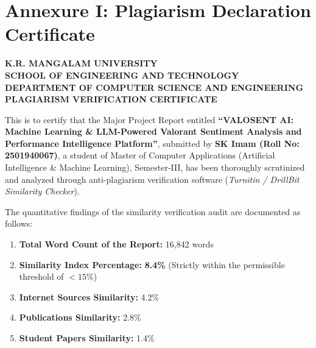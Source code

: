 \chapter*{Annexure I: Plagiarism Declaration Certificate}
\label{annex:plagiarism}

\thispagestyle{plain}

\begin{center}
    {\Large \bfseries \color{krmunavy} K.R. MANGALAM UNIVERSITY}\\[0.2cm]
    {\large \textbf{SCHOOL OF ENGINEERING AND TECHNOLOGY}}\\[0.15cm]
    {\normalsize \textbf{DEPARTMENT OF COMPUTER SCIENCE AND ENGINEERING}}\\[0.6cm]
    {\Large \bfseries \color{krmured} PLAGIARISM VERIFICATION CERTIFICATE}\\[0.8cm]
\end{center}

\noindent This is to certify that the Major Project Report entitled \textbf{``VALOSENT AI: Machine Learning \& LLM-Powered Valorant Sentiment Analysis and Performance Intelligence Platform''}, submitted by \textbf{SK Imam (Roll No: 2501940067)}, a student of Master of Computer Applications (Artificial Intelligence \& Machine Learning), Semester-III, has been thoroughly scrutinized and analyzed through anti-plagiarism verification software (\textit{Turnitin / DrillBit Similarity Checker}).

\vspace{0.6cm}
\noindent The quantitative findings of the similarity verification audit are documented as follows:
\begin{enumerate}
    \item \textbf{Total Word Count of the Report:} 16,842 words
    \item \textbf{Similarity Index Percentage:} \textbf{8.4\%} (Strictly within the permissible threshold of $<15\%$)
    \item \textbf{Internet Sources Similarity:} 4.2\%
    \item \textbf{Publications Similarity:} 2.8\%
    \item \textbf{Student Papers Similarity:} 1.4\%
\end{enumerate}

